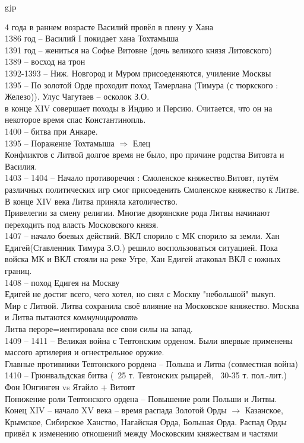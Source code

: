 gjp	 \documentclass[12pt,a4paper]{article}
\begin{document}
4 года в раннем возрасте Василий провёл в плену у Хана\\
1386 год -- Василий I покидает хана Тохтамыша\\
1391 год -- жениться на Софье Витовне (дочь великого князя Литовского) \\
1389 -- восход на трон\\
1392-1393 -- Ниж. Новгород и Муром присоеденяются, училение Москвы\\
1395 -- По золотой Орде проходит поход Тамерлана (Тимура (с тюркского : Железо)). Улус Чагутаев -- осколок З.О.\\
в конце XIV  совершает походы в Индию и Персию. Считается, что он на некоторое время спас Константинопль.\\
1400 -- битва при Анкаре.\\
1395 -- Поражение Тохтамыша $\Rightarrow$ Елец\\
Конфликтов с Литвой долгое время не было, про причине родства Витовта и Василия.\\
1403 -- 1404 -- Начало противоречия : Смоленское княжество.Витовт, путём различных политических игр смог присоеденить Смоленское княжество к Литве.\\
В конце XIV века Литва приняла католичество.\\
Привелегии за смену религии.
Многие дворянские рода Литвы начинают переходить под власть Московского князя.\\
1407 -- начало боевых действий.
ВКЛ спорило с МК спорило за земли. Хан Едигей(Ставленник Тимура З.О.) решило воспользоваться ситуацией.
Пока войска МК и ВКЛ стояли на реке Угре, Хан Едигей атаковал ВКЛ с южных границ.\\
1408 -- поход Едигея на Москву\\
Едигей не достиг всего, чего хотел, но снял с Москву  "небольшой" выкуп.\\
Мир с Литвой. Литва сохранила своё влияние на Московское княжество. Москва и Литва пытаются \textit{коммуницировать}\\
Литва пероре=иентировала все свои силы на запад.\\
1409 -- 1411 -- Великая война с Тевтонским орденом. Были впервые применены массого артилерия и огнестрельное оружие.\\
Главные противники Тевтонского рордена -- Польша и Литва (совместная война)\\
1410 -- Грюнвальдская битва (~25 т. Тевтонских рыцарей, ~30-35 т. пол.-лит.)\\
Фон Юнгинген vs Ягайло  + Витовт\\
Понижение роли Тевтонского ордена -- Повышение роли Польши и Литвы.\\
Конец XIV -- начало XV века -- время распада Золотой Орды $\rightarrow$ Казанское, Крымское, Сибирское Ханство, Нагайская Орда, Большая Орда. Распад Орды привёл к изменению отношений между Московским княжествам и частями
\end{document}
